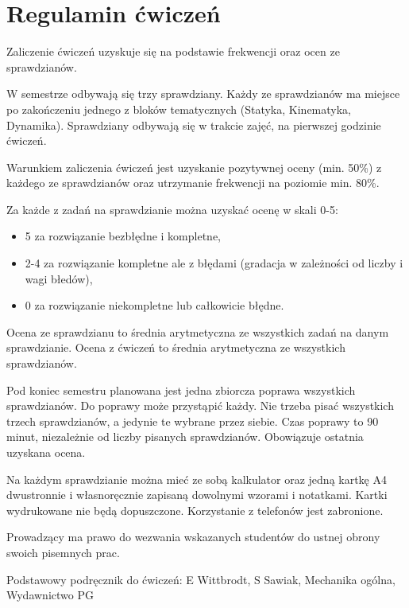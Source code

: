 \section*{Regulamin ćwiczeń}

Zaliczenie ćwiczeń uzyskuje się na podstawie frekwencji oraz ocen ze sprawdzianów.

W semestrze odbywają się trzy sprawdziany. Każdy ze sprawdzianów ma miejsce po zakończeniu jednego z bloków tematycznych (Statyka, Kinematyka, Dynamika). Sprawdziany odbywają się w trakcie zajęć, na pierwszej godzinie ćwiczeń.

Warunkiem zaliczenia ćwiczeń jest uzyskanie pozytywnej oceny (min. 50\%) z każdego ze sprawdzianów oraz utrzymanie frekwencji na poziomie min. 80\%.

Za każde z zadań na sprawdzianie można uzyskać ocenę w skali 0-5:
\begin{itemize}
    \item 5 za rozwiązanie bezbłędne i kompletne,
    \item 2-4 za rozwiązanie kompletne ale z błędami (gradacja w zależności od liczby i wagi błedów),
    \item 0 za rozwiązanie niekompletne lub całkowicie błędne.
\end{itemize}

Ocena ze sprawdzianu to średnia arytmetyczna ze wszystkich zadań na danym sprawdzianie. Ocena z ćwiczeń to średnia arytmetyczna ze wszystkich sprawdzianów.

Pod koniec semestru planowana jest jedna zbiorcza poprawa wszystkich sprawdzianów. Do poprawy może przystąpić każdy. Nie trzeba pisać wszystkich trzech sprawdzianów, a jedynie te wybrane przez siebie. Czas poprawy to 90 minut, niezależnie od liczby pisanych sprawdzianów. Obowiązuje ostatnia uzyskana ocena.

Na każdym sprawdzianie można mieć ze sobą kalkulator oraz jedną kartkę A4 dwustronnie i własnoręcznie zapisaną dowolnymi wzorami i notatkami. Kartki wydrukowane nie będą dopuszczone. Korzystanie z telefonów jest zabronione.

Prowadzący ma prawo do wezwania wskazanych studentów do ustnej obrony swoich pisemnych prac.

Podstawowy podręcznik do ćwiczeń:
E Wittbrodt, S Sawiak, Mechanika ogólna, Wydawnictwo PG